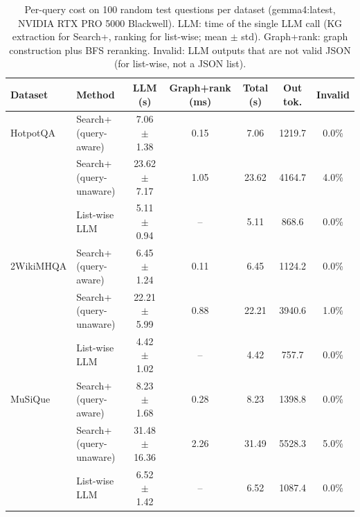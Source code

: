 \begin{table}[t]
\centering
\footnotesize
\setlength{\tabcolsep}{3pt}
\begin{tabular}{llccccc}
\toprule
\textbf{Dataset} & \textbf{Method} & \textbf{LLM (s)} & \textbf{Graph+rank (ms)} & \textbf{Total (s)} & \textbf{Out tok.} & \textbf{Invalid}\\
\midrule
HotpotQA & Search+ (query-aware) & 7.06 $\pm$ 1.38 & 0.15 & 7.06 & 1219.7 & 0.0\%\\
 & Search+ (query-unaware) & 23.62 $\pm$ 7.17 & 1.05 & 23.62 & 4164.7 & 4.0\%\\
 & List-wise LLM & 5.11 $\pm$ 0.94 & -- & 5.11 & 868.6 & 0.0\%\\
\midrule
2WikiMHQA & Search+ (query-aware) & 6.45 $\pm$ 1.24 & 0.11 & 6.45 & 1124.2 & 0.0\%\\
 & Search+ (query-unaware) & 22.21 $\pm$ 5.99 & 0.88 & 22.21 & 3940.6 & 1.0\%\\
 & List-wise LLM & 4.42 $\pm$ 1.02 & -- & 4.42 & 757.7 & 0.0\%\\
\midrule
MuSiQue & Search+ (query-aware) & 8.23 $\pm$ 1.68 & 0.28 & 8.23 & 1398.8 & 0.0\%\\
 & Search+ (query-unaware) & 31.48 $\pm$ 16.36 & 2.26 & 31.49 & 5528.3 & 5.0\%\\
 & List-wise LLM & 6.52 $\pm$ 1.42 & -- & 6.52 & 1087.4 & 0.0\%\\
\bottomrule
\end{tabular}
\caption{Per-query cost on 100 random test questions per dataset (gemma4:latest, NVIDIA RTX PRO 5000 Blackwell). LLM: time of the single LLM call (KG extraction for Search+, ranking for list-wise; mean $\pm$ std). Graph+rank: graph construction plus BFS reranking. Invalid: LLM outputs that are not valid JSON (for list-wise, not a JSON list).}
\label{tab:latency}
\end{table}
